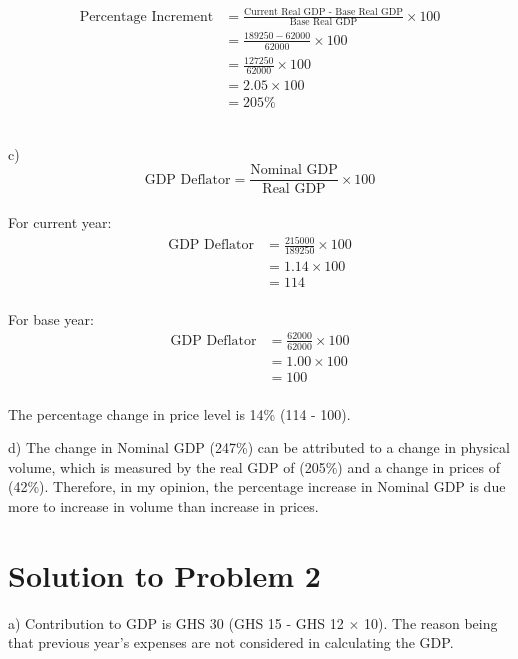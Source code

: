 \documentclass[12pt]{article}
\begin{document}
\begin{equation*}
\begin{split}
\text{Percentage Increment}  &= \frac{\text{Current Real GDP - Base Real GDP}}{\text{Base Real GDP}} \times 100\\
&= \frac{189250 - 62000}{62000} \times 100\\
&= \frac{127250}{62000} \times 100\\
&= 2.05 \times 100\\
&= 205 \%
\end{split}
\end{equation*}\\
\vspace{0.5cm}

c) \begin{equation*}
	\text{GDP Deflator} = \frac{\text{Nominal GDP}}{\text{Real GDP}} \times 100
\end{equation*}\\
\vspace{0.3cm}
For current year:
\begin{equation*}
	\begin{split}
		\text{GDP Deflator} &= \frac{215000}{189250} \times 100\\
		&= 1.14 \times 100\\
		&= 114\\
	\end{split}
\end{equation*}

For base year:
\begin{equation*}
\begin{split}
\text{GDP Deflator} &= \frac{62000}{62000} \times 100\\
&= 1.00 \times 100\\
&= 100\\
\end{split}
\end{equation*}

The percentage change in price level is 14\% (114 - 100).\\
\vspace{0.5cm}

d) The change in Nominal GDP (247\%) can be attributed to a change in physical volume, which is measured by the real GDP of (205\%) and a change in prices of (42\%). Therefore, in my opinion, the percentage increase in Nominal GDP is due more to increase in volume than increase in prices.

\section*{Solution to Problem 2}
a) Contribution to GDP is GHS 30 (GHS 15 - GHS 12 $\times$ 10). The reason being that previous year's expenses are not considered in calculating the GDP.
\\
\end{document}

